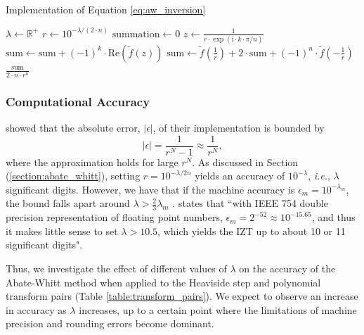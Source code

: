 \documentclass[a4paper]{report}
\begin{document}
\begin{algorithm}[H]
    \caption{Implementation of Equation \ref{eq:aw_inversion}}
    \label{algo:abate_whitt}
    \begin{algorithmic}[1]
        \State $\lambda \gets \mathbb{R}^+$
        \State $r \gets 10^{-\lambda / (2 \cdot n)}$
        \State $\text{summation} \gets 0$
            \State $z \gets \frac{1}{r \cdot \exp(\text{i} \cdot k \cdot \pi / n)}$
            \State $\text{sum} \gets \text{sum} + (-1)^k \cdot \text{Re}(\tilde{f}(z))$
        \EndFor
        \State $\text{sum} \gets \tilde{f}(\frac{1}{r}) + 2 \cdot \text{sum} + (-1)^n \cdot \tilde{f}(-\frac{1}{r})$
        \State \Return $\frac{\text{sum}}{2 \cdot n \cdot r^n}$
    \EndProcedure
    \end{algorithmic}
\end{algorithm}

\subsubsection{Computational Accuracy}
\citet{AbateWhitt1992a, AbateWhitt1992b} showed that the absolute error, $|\epsilon |$, of their implementation is bounded by
\begin{equation}
	| \epsilon | = \frac{1}{r^N - 1} \approx \frac{1}{r^N},
\end{equation}
where the approximation holds for large $r^N$. As discussed in Section (\ref{section:abate_whitt}), setting $r=10^{-\lambda / 2n}$  yields an accuracy of $10^{-\lambda}$, \textit{i.e.}, $\lambda$ significant digits. However, we have that if the machine accuracy is $\epsilon_m = 10^{-\lambda_m}$, the bound falls apart around $\lambda > \frac{2}{3} \lambda_m$ \citep[Remark 5.8]{AbateWhitt1992a}. \citet{loveless2023phelanguido} states that ``with IEEE 754 double precision representation of floating point numbers, $\epsilon_m = 2^{-52} \approx 10^{-15.65}$, and thus it makes little sense to set $\lambda > 10.5$, which yields the IZT up to about 10 or 11 significant digits".

Thus, we investigate the effect of different values of $\lambda$ on the accuracy of the Abate-Whitt method when applied to the Heaviside step and polynomial transform pairs (Table \ref{table:transform_pairs}). We expect to observe an increase in accuracy as $\lambda$ increases, up to a certain point where the limitations of machine precision and rounding errors become dominant.
\end{document}
